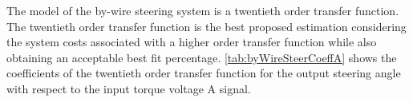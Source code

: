 \documentclass[letterpaper,12pt]{article}   %
\begin{document}
\vspace{12pt}
\noindent The model of the by-wire steering system is a twentieth order transfer function. The twentieth order transfer function is the best proposed estimation considering the system costs associated with a higher order transfer function while also obtaining an acceptable best fit percentage. \autoref{tab:byWireSteerCoeffA} shows the coefficients of the twentieth order transfer function for the output steering angle with respect to the input torque voltage A signal.%
%
\begin{table}[hbtp]
	\label{tab:byWireSteerCoeffA}
	\caption{By-Wire Mode Steering Transfer Function Torque Voltage A Coefficient Table}
  \centering
    
	\begin{center}
	\end{center}	
\end{table}
%
 
\end{document}
